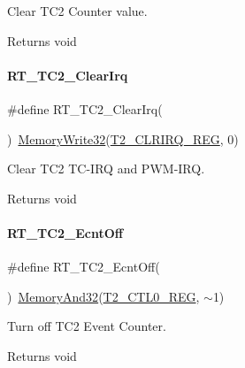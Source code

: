 Clear T\+C2 Counter value. 

\begin{DoxyReturn}{Returns}
void 
\end{DoxyReturn}
\mbox{\label{a00047_a92052b959fbb893385c5adc2c4b00bad}} 
\paragraph{\texorpdfstring{R\+T\+\_\+\+T\+C2\+\_\+\+Clear\+Irq}{RT\_TC2\_ClearIrq}}
{\footnotesize\ttfamily \#define R\+T\+\_\+\+T\+C2\+\_\+\+Clear\+Irq(\begin{DoxyParamCaption}{ }\end{DoxyParamCaption})~\mbox{\hyperlink{a00020_a6b9732365b12e48ddb89fe1028b975b0}{Memory\+Write32}}(\mbox{\hyperlink{a00020_aba8ec9cd37a1487a613cca0194e62f15}{T2\+\_\+\+C\+L\+R\+I\+R\+Q\+\_\+\+R\+EG}}, 0)}



Clear T\+C2 T\+C-\/\+I\+RQ and P\+W\+M-\/\+I\+RQ. 

\begin{DoxyReturn}{Returns}
void 
\end{DoxyReturn}
\mbox{\label{a00047_af77e205baae8e267fda5374c167ab76c}} 
\paragraph{\texorpdfstring{R\+T\+\_\+\+T\+C2\+\_\+\+Ecnt\+Off}{RT\_TC2\_EcntOff}}
{\footnotesize\ttfamily \#define R\+T\+\_\+\+T\+C2\+\_\+\+Ecnt\+Off(\begin{DoxyParamCaption}{ }\end{DoxyParamCaption})~\mbox{\hyperlink{a00020_ad87cedffcaadc51db22594fce55173d4}{Memory\+And32}}(\mbox{\hyperlink{a00020_a5853553391e986211306d4f29ab31e47}{T2\+\_\+\+C\+T\+L0\+\_\+\+R\+EG}}, $\sim$1)}



Turn off T\+C2 Event Counter. 

\begin{DoxyReturn}{Returns}
void 
\end{DoxyReturn}
\mbox{\label{a00047_a261544e2cbdbdeee0d22734b29827cd2}} 
